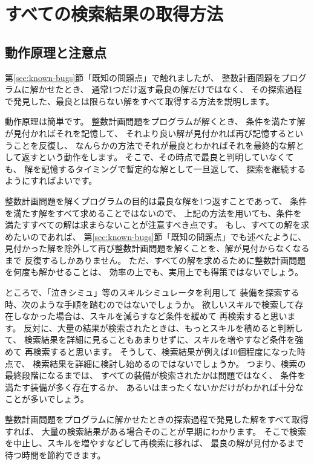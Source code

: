 \documentclass{jsarticle}
\begin{document}
\section{すべての検索結果の取得方法}
\subsection{動作原理と注意点}
第\ref{sec:known-bugs}節「既知の問題点」で触れましたが、
整数計画問題をプログラムに解かせたとき、
通常1つだけ返す最良の解だけではなく、
その探索過程で発見した、最良とは限らない解をすべて取得する方法を説明します。

動作原理は簡単です。
整数計画問題をプログラムが解くとき、
条件を満たす解が見付かればそれを記憶して、
それより良い解が見付かれば再び記憶するということを反復し、
なんらかの方法でそれが最良とわかればそれを最終的な解として返すという動作をします。
%
そこで、その時点で最良と判明していなくても、
解を記憶するタイミングで暫定的な解として一旦返して、
探索を継続するようにすればよいです。

整数計画問題を解くプログラムの目的は最良な解を1つ返すことであって、
条件を満たす解をすべて求めることではないので、
上記の方法を用いても、条件を満たすすべての解は求まらないことが注意すべき点です。
%
もし、すべての解を求めたいのであれば、
第\ref{sec:known-bugs}節「既知の問題点」でも述べたように、
見付かった解を除外して再び整数計画問題を解くことを、解が見付からなくなるまで
反復するしかありません。
ただ、すべての解を求めるために整数計画問題を何度も解かせることは、
効率の上でも、実用上でも得策ではないでしょう。

ところで、「泣きシミュ」等のスキルシミュレータを利用して
装備を探索する時、次のような手順を踏むのではないでしょうか。
%
欲しいスキルで検索して存在しなかった場合は、スキルを減らすなど条件を緩めて
再検索すると思います。
%
反対に、大量の結果が検索されたときは、もっとスキルを積めると判断して、
検索結果を詳細に見ることもあまりせずに、スキルを増やすなど条件を強めて
再検索すると思います。
%
そうして、検索結果が例えば10個程度になった時点で、
検索結果を詳細に検討し始めるのではないでしょうか。
%
つまり、検索の最終段階になるまでは、
すべての装備が検索されたかは問題ではなく、
条件を満たす装備が多く存在するか、
あるいはまったくないかだけがわかれば十分なことが多いでしょう。

整数計画問題をプログラムに解かせたときの探索過程で発見した解をすべて取得すれば、
大量の検索結果がある場合そのことが早期にわかります。
そこで検索を中止し、スキルを増やすなどして再検索に移れば、
最良の解が見付かるまで待つ時間を節約できます。
\end{document}
